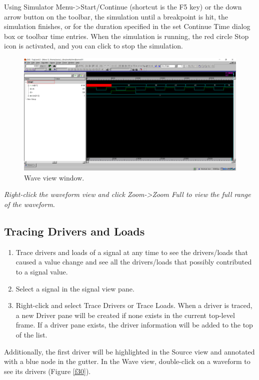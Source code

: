 \documentclass[a4paper,12pt,twoside]{article}
\begin{document}
Using Simulator Menu->Start/Continue (shortcut is the F5 key) or the down arrow button on the toolbar, the simulation until a breakpoint is hit, the simulation finishes, or for the duration specified in the set Continue Time dialog box or toolbar time entries. When the simulation is running, the red circle Stop icon is activated, and you can click to stop the simulation.
\begin{figure}[H]
    \centering
    \includegraphics[width=\textwidth]{images/29.png}
    \caption{Wave view window.}
\end{figure}
\textit{Right-click the waveform view and click Zoom->Zoom Full to view the full range of the waveform}.
\subsection{Tracing Drivers and Loads}\label{SDrv}
\begin{enumerate}
    \item Trace drivers and loads of a signal at any time to see the drivers/loads that caused a value change and see all the drivers/loads that possibly contributed to a signal value.
    \item Select a signal in the signal view pane.
    \item Right-click and select Trace Drivers or Trace Loads. When a driver is traced, a new Driver pane will be created if none exists in the current top-level frame. If a driver pane exists, the driver information will be added to the top of the list.
\end{enumerate}
Additionally, the first driver will be highlighted in the Source view and annotated with a blue node in the gutter. In the
Wave view, double-click on a waveform to see its drivers (Figure \ref{f30}).
\end{document}
